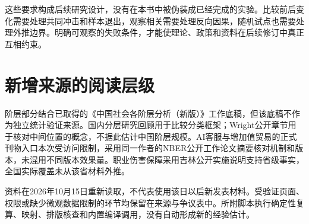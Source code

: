 \documentclass[UTF8,fontset=fandol,zihao=-4,oneside,openany]{ctexbook}
\begin{document}
这些要求构成后续研究设计，没有在本书中被伪装成已经完成的实验。比较前后变化需要处理共同冲击和样本退出，观察相关需要处理反向因果，随机试点也需要处理外推边界。明确可观察的失败条件，才能使理论、政策和资料在后续修订中真正互相约束。

\section{新增来源的阅读层级}
阶层部分结合已取得的《中国社会各阶层分析（新版）》工作底稿，但该底稿不作为独立统计验证来源。国内分层研究回顾用于比较分类框架；Wright公开章节用于核对中间位置的概念，不据此估计中国阶层规模。AI客服与增加值贸易的正式刊物入口本次受访问限制，采用同一作者的NBER公开工作论文摘要核对机制和版本，未混用不同版本效果量。职业伤害保障采用吉林公开实施说明支持省级事实，全国实际覆盖未从该省材料外推。

资料在2026年10月15日重新读取，不代表使用该日以后新发表材料。受验证页面、权限或缺少微观数据限制的环节均保留在来源与争议表中。所附脚本执行确定性复算、映射、排版核查和内置编译调用，没有自动形成新的经验估计。

\backmatter

\renewcommand{\bibname}{参考文献与数据来源}

\cleardoublepage{}

\end{document}
